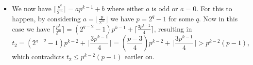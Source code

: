 \documentclass[11pt,a4paper]{article}
\begin{document}
\begin{enumerate}
\begin{itemize}
        	\item We now have $\lceil \frac{p^k}{2^m}\rceil = ap^{k-1}+b$ where either $a$ is odd or $a=0$. 
        	For this to happen, by considering $a = \lfloor \frac{p}{2^m}\rfloor$ we have $p=2^q-1$ for some $q$. 
        	Now in this case we have 
        	$\lceil \frac{p^k}{2^m}\rceil = (2^{q-2} - 1)p^{k-1}+\lceil\frac{3p^{k-2}}{4}\rceil $, 
        	resulting in 
        	\[t_2 = (2^{q-2} - 1)p^{k-2} + \lceil\frac{3p^{k-1}}{4}\rceil 
        	= (\frac{p-3}{4})p^{k-2} + \lceil\frac{3p^{k-1}}{4}\rceil > p^{k-2}(p - 1),
        	\]
        	which contradicts $t_2\le p^{k-2}(p - 1)$ eariler on. 
        \end{itemize}
         
	\end{enumerate}
\end{document}
